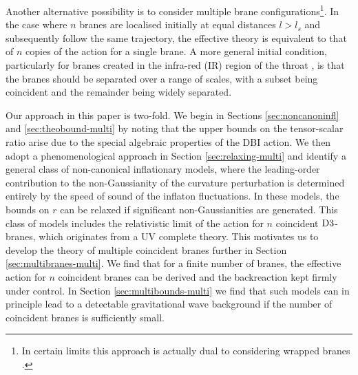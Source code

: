 Another alternative possibility is to consider 
multiple brane configurations\footnote{In certain limits this approach 
is actually dual to considering wrapped branes \cite{Ward:2007gs}.}. 
In the case where  
$n$ branes are localised initially at equal distances $l > l_s$ and 
subsequently follow the same trajectory, 
the effective theory is equivalent to that of $n$ copies of the
action for a single brane. A more general initial condition, particularly
for branes created in the infra-red (IR) region of the throat
\cite{brane13, DeWolfe:2004qx, Kachru:2002gs}, is that
the branes should be separated over a range of scales, 
with a subset being coincident and the remainder being widely separated. 


Our approach in this paper is two-fold. We 
begin in Sections \ref{sec:noncanoninfl} and \ref{sec:theobound-multi} 
by noting that the upper bounds on the tensor-scalar ratio arise due to the
special algebraic properties of the DBI action. We 
then adopt a phenomenological approach in Section \ref{sec:relaxing-multi}
and identify a general class of non-canonical inflationary models, 
where the leading-order contribution to the non-Gaussianity of the 
curvature perturbation is determined 
entirely by the speed of sound of the inflaton fluctuations. 
In these models, the bounds on $r$ can be relaxed 
if significant non-Gaussianities are generated.  
This class of models includes the relativistic limit  
of the action for $n$ coincident ${\rm D3}$-branes, 
which originates from a UV complete theory. This motivates us 
to develop the theory of multiple coincident branes further in Section
\ref{sec:multibranes-multi}. We find that for a finite number of branes, 
the effective action for $n$ coincident branes can be derived and the backreaction
kept firmly under control.
In Section \ref{sec:multibounds-multi} we find that such models 
can in principle lead to a detectable 
gravitational wave background if 
the number of coincident branes is sufficiently small. 





% 
% 
